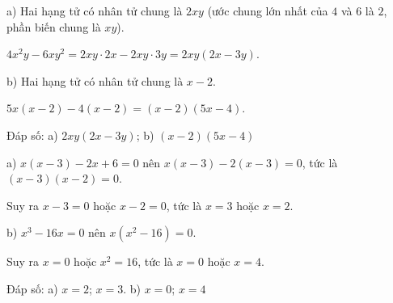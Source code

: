 \begin{problem}[8DS-PTNT-001]
a) Hai hạng tử có nhân tử chung là $2xy$ (ước chung lớn nhất của $4$ và $6$ là $2$, phần biến chung là $xy$).

$4x^2y - 6xy^2 = 2xy \cdot 2x - 2xy \cdot 3y = 2xy(2x - 3y)$.

b) Hai hạng tử có nhân tử chung là $x - 2$.

$5x(x - 2) - 4(x - 2) = (x - 2)(5x - 4)$.

Đáp số: a) $2xy(2x - 3y)$; b) $(x - 2)(5x - 4)$
\end{problem}

\begin{problem}[8DS-PTNT-013]
a) $x(x - 3) - 2x + 6 = 0$ nên $x(x - 3) - 2(x - 3) = 0$, tức là $(x - 3)(x - 2) = 0$.

Suy ra $x - 3 = 0$ hoặc $x - 2 = 0$, tức là $x = 3$ hoặc $x = 2$.

b) $x^3 - 16x = 0$ nên $x(x^2 - 16) = 0$.

Suy ra $x = 0$ hoặc $x^2 = 16$, tức là $x = 0$ hoặc $x = 4$.

Đáp số: a) $x = 2$; $x = 3$. b) $x = 0$; $x = 4$
\end{problem}
